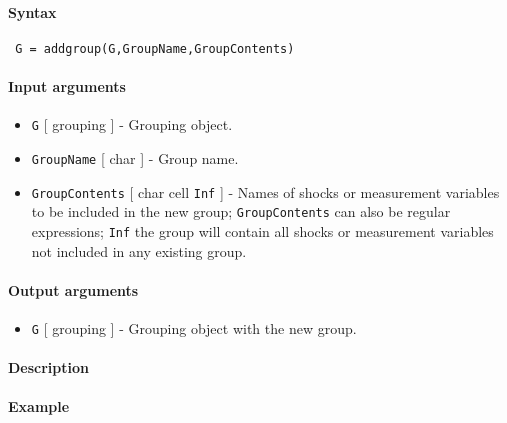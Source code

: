 


	\paragraph{Syntax}
 
 \begin{verbatim}
 G = addgroup(G,GroupName,GroupContents)
 \end{verbatim}
 
 \paragraph{Input arguments}
 
 \begin{itemize}
 \item
   \texttt{G} {[} grouping {]} - Grouping object.
 \item
   \texttt{GroupName} {[} char {]} - Group name.
 \item
   \texttt{GroupContents} {[} char \textbar{} cell \textbar{}
   \texttt{Inf} {]} - Names of shocks or measurement variables to be
   included in the new group; \texttt{GroupContents} can also be regular
   expressions; \texttt{Inf} the group will contain all shocks or
   measurement variables not included in any existing group.
 \end{itemize}
 
 \paragraph{Output arguments}
 
 \begin{itemize}
 \item
   \texttt{G} {[} grouping {]} - Grouping object with the new group.
 \end{itemize}
 
 \paragraph{Description}
 
 \paragraph{Example}


